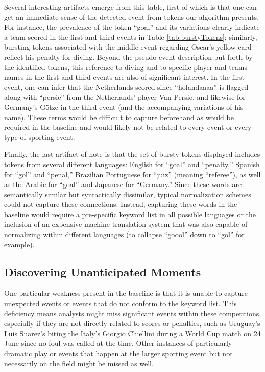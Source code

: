 \documentclass{sig-alternate}
\begin{document}
Several interesting artifacts emerge from this table, first of which is that one can get an immediate sense of the detected event from tokens our algorithm presents. 
For instance, the prevalence of the token ``goal'' and its variations clearly indicate a team scored in the first and third events in Table \ref{tab:burstyTokens}; similarly, bursting tokens associated with the middle event regarding Oscar's yellow card reflect his penalty for diving.
Beyond the pseudo event description put forth by the identified tokens, this reference to diving and to specific player and teams names in the first and third events are also of significant interest.
In the first event, one can infer that the Netherlands scored since ``holandaaaa'' is flagged along with ``persie'' from the Netherlands' player Van Persie, and likewise for Germany's G\"{o}tze in the third event (and the accompanying variations of his name).
These terms would be difficult to capture beforehand as would be required in the baseline and would likely not be related to every event or every type of sporting event.

Finally, the last artifact of note is that the set of bursty tokens displayed includes tokens from several different languages: English for ``goal'' and ``penalty,'' Spanish for ``gol'' and ``penal,'' Brazilian Portuguese for ``juiz'' (meaning ``referee''), as well as the Arabic for ``goal'' and Japanese for ``Germany.''
Since these words are semantically similar but syntactically dissimilar, typical normalization schemes could not capture these connections.
Instead, capturing these words in the baseline would require a pre-specific keyword list in all possible languages or the inclusion of an expensive machine translation system that was also capable of normalizing within different languages (to collapse ``goool'' down to ``gol'' for example).

\subsection{Discovering Unanticipated Moments}
\label{sect:eventDiscovery}

One particular weakness present in the baseline is that it is unable to capture unexpected events or events that do not conform to the keyword list.
This deficiency means analysts might miss significant events within these competitions, especially if they are not directly related to scores or penalties, such as Uruguay's Luis Suarez's biting the Italy's Giorgio Chiellini during a World Cup match on 24 June since no foul was called at the time.
Other instances of particularly dramatic play or events that happen at the larger sporting event but not necessarily on the field might be missed as well.
\end{document}
